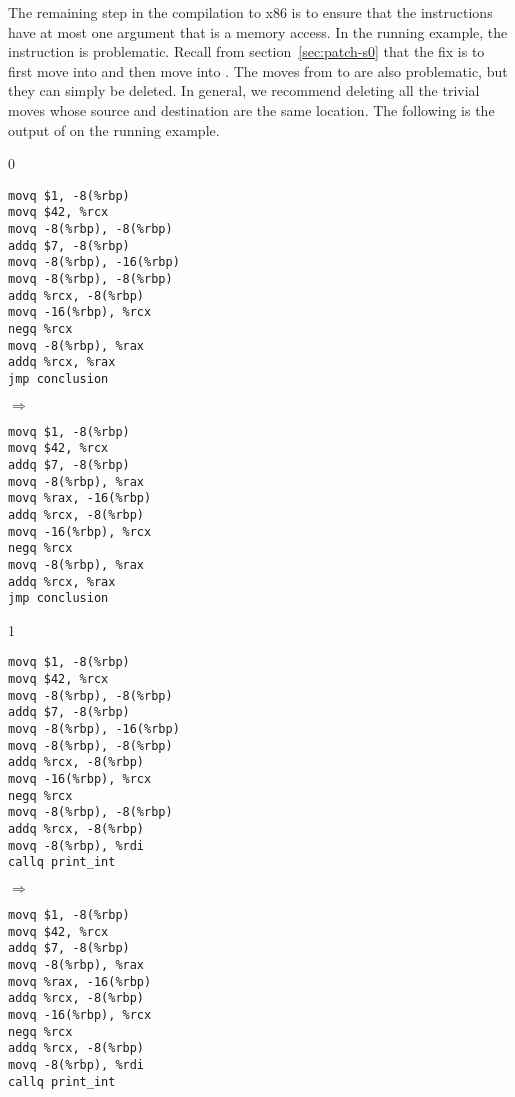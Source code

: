 \documentclass[7x10]{TimesAPriori_MIT}%
\def\racketEd{0}
\def\pythonEd{1}
\def\edition{1}
\newcommand{\pythonColor}[0]{}
\numberwithin{theorem}{chapter}
\numberwithin{definition}{chapter}
\numberwithin{equation}{chapter}
\begin{document}
The remaining step in the compilation to x86 is to ensure that the
instructions have at most one argument that is a memory access.
%
In the running example, the instruction  is problematic. Recall from section~\ref{sec:patch-s0}
  that the fix is to first move  into  and
  then move  into .
%
The moves from  to  are also
problematic, but they can simply be deleted. In general, we recommend
deleting all the trivial moves whose source and destination are the
same location.
%
The following is the output of  on the
running example.
\begin{center}
{\if\edition\racketEd      
\begin{minipage}{0.35\textwidth}
\begin{lstlisting}
movq $1, -8(%rbp)
movq $42, %rcx
movq -8(%rbp), -8(%rbp)
addq $7, -8(%rbp)
movq -8(%rbp), -16(%rbp)
movq -8(%rbp), -8(%rbp)
addq %rcx, -8(%rbp)
movq -16(%rbp), %rcx
negq %rcx
movq -8(%rbp), %rax
addq %rcx, %rax
jmp conclusion
\end{lstlisting}
\end{minipage}
$\Rightarrow\qquad$
\begin{minipage}{0.45\textwidth}
\begin{lstlisting}
movq $1, -8(%rbp)
movq $42, %rcx
addq $7, -8(%rbp)
movq -8(%rbp), %rax
movq %rax, -16(%rbp)
addq %rcx, -8(%rbp)
movq -16(%rbp), %rcx
negq %rcx
movq -8(%rbp), %rax
addq %rcx, %rax
jmp conclusion
\end{lstlisting}
\end{minipage}
\fi}
{\if\edition\pythonEd\pythonColor
\begin{minipage}{0.35\textwidth}
\begin{lstlisting}
movq $1, -8(%rbp)
movq $42, %rcx
movq -8(%rbp), -8(%rbp)
addq $7, -8(%rbp)
movq -8(%rbp), -16(%rbp)
movq -8(%rbp), -8(%rbp)
addq %rcx, -8(%rbp)
movq -16(%rbp), %rcx
negq %rcx
movq -8(%rbp), -8(%rbp)
addq %rcx, -8(%rbp)
movq -8(%rbp), %rdi
callq print_int    
\end{lstlisting}
\end{minipage}
$\Rightarrow\qquad$
\begin{minipage}{0.45\textwidth}
\begin{lstlisting}
movq $1, -8(%rbp)
movq $42, %rcx
addq $7, -8(%rbp)
movq -8(%rbp), %rax
movq %rax, -16(%rbp)
addq %rcx, -8(%rbp)
movq -16(%rbp), %rcx
negq %rcx
addq %rcx, -8(%rbp)
movq -8(%rbp), %rdi
callq print_int    
\end{lstlisting}
\end{minipage}
\fi}
\end{center}
\end{document}
